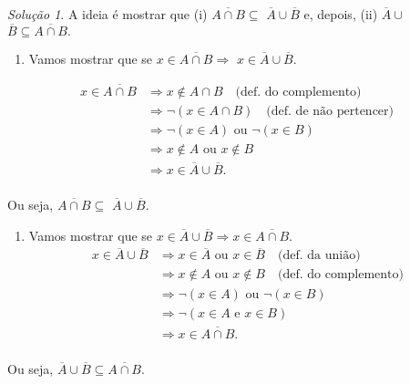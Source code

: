 \documentclass[]{book}
\providecommand{\tightlist}{%
  \setlength{\itemsep}{0pt}\setlength{\parskip}{0pt}}
\theoremstyle{definition}
\theoremstyle{definition}
\theoremstyle{definition}
\theoremstyle{remark}
\newtheorem*{solution}{Solução}
\begin{document}
\begin{solution}
\iffalse{} {Solução. } \fi{}A ideia é mostrar que (i) \(\overline{A\cap B} \subseteq\) \(\overline A \cup \overline B\) e, depois, (ii) \(\overline A \cup\) \(\overline B \subseteq \overline{A\cap B}.\)

\begin{enumerate}
\def\labelenumi{(\roman{enumi})}
\tightlist
\item
  Vamos mostrar que se \(x \in \overline{A\cap B} \Rightarrow\) \(x \in \overline A \cup \overline B.\)
\end{enumerate}

\begin{align}
x \in \overline{A\cap B} &\Rightarrow
x \notin A\cap B \quad \text{(def. do complemento)}\\
& \Rightarrow \neg(x \in A\cap B) \quad \text{(def. de não pertencer)}\\
& \Rightarrow \neg(x \in A) \text{ ou } \neg(x \in B)\\
& \Rightarrow x \notin A \text{ ou } x \notin B\\
& \Rightarrow x \in \overline A \cup \overline B.\\
\end{align}

Ou seja, \(\overline{A\cap B} \subseteq\) \(\overline A \cup \overline B.\)

\begin{enumerate}
\def\labelenumi{(\roman{enumi})}
\setcounter{enumi}{1}
\tightlist
\item
  Vamos mostrar que se \(x \in \overline A \cup \overline B \Rightarrow x \in \overline{A\cap B}.\)
  \begin{align}
  x \in \overline A \cup \overline B &\Rightarrow
  x \in \overline A \text{ ou } x \in \overline B \quad\text{(def. da união)}\\
  & \Rightarrow x \notin A \text{ ou } x \notin B\quad\text{(def. do complemento)}\\
  & \Rightarrow \neg(x \in A) \text{ ou } \neg(x \in B)\\
  & \Rightarrow \neg(x \in A \text{ e } x \in B) \\
  & \Rightarrow x \in \overline{A\cap B}.\\
  \end{align}
\end{enumerate}

Ou seja, \(\overline A \cup \overline B \subseteq \overline{A\cap B}.\)
\end{solution}
\end{document}
